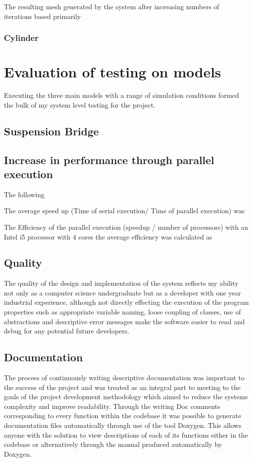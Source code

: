 \documentclass{article}
\begin{document}
The resulting mesh generated by the system after increasing numbers of iterations based primarily


\subsubsection{Cylinder}


\newpage

\section{Evaluation of testing on models}
Executing the three main models with a range of simulation conditions formed the bulk of my system level testing for the project.

\subsection{Suspension Bridge}








\subsection{Increase in performance through parallel execution}
The following 

The average speed up (Time of serial execution/ Time of parallel execution) was 


The Efficiency of the parallel execution (speedup / number of processors) with an Intel i5 processor with 4 cores the average efficiency  was calculated as

\subsection{Quality}
The quality of the design and implementation of the system reflects my ability not only as a computer science undergraduate but as a developer with one year industrial experience, although not directly effecting the execution of the program properties such as appropriate variable naming, loose coupling of classes, use of abstractions and descriptive error messages make the software easier to read and debug for any potential future developers.


\subsection{Documentation}
The process of continuously writing descriptive documentation was important to the success of the project and was treated as an integral part to meeting to the goals of the project development methodology which aimed to reduce the systems complexity and improve readability. Through the writing Doc comments corresponding to every function within the codebase it was possible to generate documentation files automatically through use of the tool Doxygen. This allows anyone with the solution to view descriptions of each of its functions either in the codebase or alternatively through the manual produced automatically by Doxygen.
\end{document}
